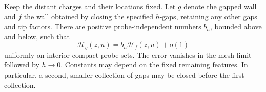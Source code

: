 \begin{proposition}
\label{gap:closure}
Keep the distant charges and their locations fixed.  Let $g$ denote
the gapped wall and $f$ the wall obtained by closing the specified
$h$-gaps, retaining any other gaps and tip factors.  There are positive
probe-independent numbers $b_n$, bounded above and below, such that
\begin{equation}
 \mathcal H_g(z,u)=b_n\mathcal H_f(z,u)+o(1)
 \label{gap:comparison}
\end{equation}
uniformly on interior compact probe sets.  The error vanishes in the
mesh limit followed by $h\to0$.  Constants may depend on the fixed
remaining features.  In particular, a second, smaller collection of
gaps may be closed before the first collection.
\end{proposition}

